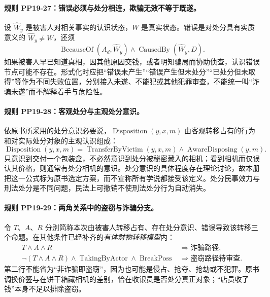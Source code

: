 \paragraph{规则 PP19-27：错误必须与处分相连，欺骗无效不等于既遂。}
\mbox{}\par
设 $\widehat{W}_y$ 是被害人对相关事实的认识状态，$W$ 是真实状态。错误是对处分具有实质意义的 $\widehat{W}_y\ne W$，还须
\[
\operatorname{BecauseOf}(A_d,\widehat{W}_y)
\land\operatorname{CausedBy}(\widehat{W}_y,D).
\]
如果被害人早已知道真相，因其他原因交钱，或者明知骗局而协助侦查，认识错误节点可能不存在。形式化时应把“错误未产生”“错误产生但未处分”“已处分但未取得”等作为不同失败位置，分别接入未遂、不能犯或其他犯罪审查，不能统一叫“诈骗未遂”而不解释着手与危险性。

\paragraph{规则 PP19-28：客观处分与主观处分意识。}
\mbox{}\par
依原书所采用的处分意识必要说，$\operatorname{Disposition}(y,x,m)$ 由客观转移占有的行为和对实际处分对象的主观认识组成：
\[
\operatorname{Disposition}(y,x,m)
=\operatorname{TransferByVictim}(y,x,m)
\land\operatorname{AwareDisposing}(y,m).
\]
只意识到交付一个包装盒，不必然意识到处分被秘密藏入的相机；看到相机而仅误认其价格，则通常有处分相机的意识。处分意识的具体程度存在理论讨论，故本册把这一公式标为原书选定方案，而不宣称所有学说都接受该定义。处分民事效力与刑法处分是不同问题，民法上可撤销不使刑法处分行为自动消失。

\paragraph{规则 PP19-29：两角关系中的盗窃与诈骗分支。}
\mbox{}\par
令 $T$、$A$、$R$ 分别简称本次由被害人转移占有、存在处分意识、错误导致该转移三个命题。在其他条件已经补齐的\emph{有体财物转移模型}内：
\[
\begin{aligned}
T\land A\land R&\Rightarrow\text{诈骗路径},\\
\neg(T\land A\land R)\land\operatorname{TakingByActor}
\land\operatorname{BreakPoss}&\Rightarrow\text{盗窃路径待审查}.
\end{aligned}
\]
第二行不能省为“非诈骗即盗窃”，因为也可能是侵占、抢夺、抢劫或不犯罪。原书调换价签与在饼干箱藏相机的差别，恰在收银员是否处分真正对象；“店员收了钱”本身不足以排除盗窃。

